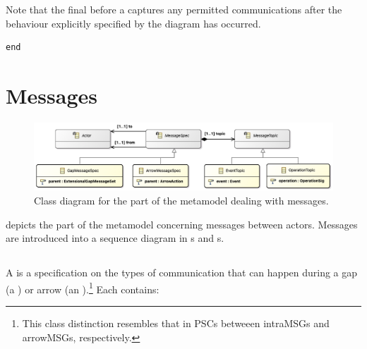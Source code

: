 




Note that the final \msequencegap{} before a \mfinalaction{} captures
any permitted communications after the behaviour explicitly specified by the
diagram has occurred.

\begin{lstlisting}[style=Example]
end
\end{lstlisting}


\section{Messages}\label{sec:metamodel-messages}

\begin{figure}
	\centering
	\includegraphics[width=\textwidth]{diagrams/messages.png}
	\caption{Class diagram for the part of the \langname{} metamodel dealing with messages.}
	\label{fig:metamodel-messages}
\end{figure}

 depicts the part of the metamodel concerning
messages between actors.  Messages are introduced into a sequence diagram
in \mgapmessageset s and \marrowaction s.

\subsection{\mmessagespec}

A \mmessagespec{} is a specification on the types of communication that can
happen during a gap (a \mgapmessagespec) or arrow (an \marrowmessagespec).\footnote{
This class distinction resembles that in PSCs betweeen intraMSGs and arrowMSGs,
respectively.}  Each \mmessagespec{} contains:

